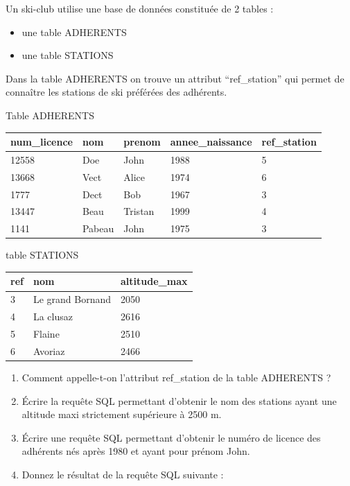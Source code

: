 \documentclass[
  a4paper,
  DIV=11,
  numbers=noendperiod]{scrartcl}
\providecommand{\tightlist}{%
  \setlength{\itemsep}{0pt}\setlength{\parskip}{0pt}}\usepackage{longtable,booktabs,array}
\begin{document}
Un ski-club utilise une base de données constituée de 2 tables :

\begin{itemize}
\tightlist
\item
  une table ADHERENTS
\item
  une table STATIONS
\end{itemize}

Dans la table ADHERENTS on trouve un attribut ``ref\_station'' qui
permet de connaître les stations de ski préférées des adhérents.

Table ADHERENTS

\begin{longtable}[]{@{}lllll@{}}
\toprule()
num\_licence & nom & prenom & annee\_naissance & ref\_station \\
\midrule()
\endhead
12558 & Doe & John & 1988 & 5 \\
13668 & Vect & Alice & 1974 & 6 \\
1777 & Dect & Bob & 1967 & 3 \\
13447 & Beau & Tristan & 1999 & 4 \\
1141 & Pabeau & John & 1975 & 3 \\
\bottomrule()
\end{longtable}

table STATIONS

\begin{longtable}[]{@{}lll@{}}
\toprule()
ref & nom & altitude\_max \\
\midrule()
\endhead
3 & Le grand Bornand & 2050 \\
4 & La clusaz & 2616 \\
5 & Flaine & 2510 \\
6 & Avoriaz & 2466 \\
\bottomrule()
\end{longtable}

\begin{enumerate}
\def\labelenumi{\arabic{enumi}.}
\tightlist
\item
  Comment appelle-t-on l'attribut ref\_station de la table ADHERENTS ?
\item
  Écrire la requête SQL permettant d'obtenir le nom des stations ayant
  une altitude maxi strictement supérieure à 2500 m.
\item
  Écrire une requête SQL permettant d'obtenir le numéro de licence des
  adhérents nés après 1980 et ayant pour prénom John.
\item
  Donnez le résultat de la requête SQL suivante :
\end{enumerate}
\end{document}
